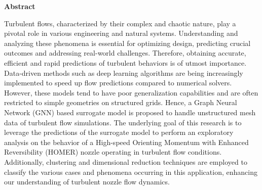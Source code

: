 \clearemptydoublepage
{}
{}

\vspace*{2cm}
\begin{center}
{\Large \textbf{Abstract}}
\end{center}
\vspace{1cm}
Turbulent flows, characterized by their complex and chaotic nature, play a pivotal role in various engineering and natural systems. Understanding and analyzing these phenomena is essential for optimizing design, predicting crucial outcomes and addressing real-world challenges. Therefore, obtaining accurate, efficient and rapid predictions of turbulent behaviors is of utmost importance. Data-driven methods such as deep learning algorithms are being increasingly implemented to speed up flow predictions compared to numerical solvers. However, these models tend to have poor generalization capabilities and are often restricted to simple geometries on structured grids. Hence, a Graph Neural Network (GNN) based surrogate model is proposed to handle unstructured mesh data of turbulent flow simulations. The underlying goal of this research is to leverage the predictions of the surrogate model to perform an exploratory analysis on the behavior of a High-speed Orienting Momentum with Enhanced Reversibility (HOMER) nozzle operating in turbulent flow conditions. Additionally, clustering and dimensional reduction techniques are employed to classify the various cases and phenomena occurring in this application, enhancing our understanding of turbulent nozzle flow dynamics.
